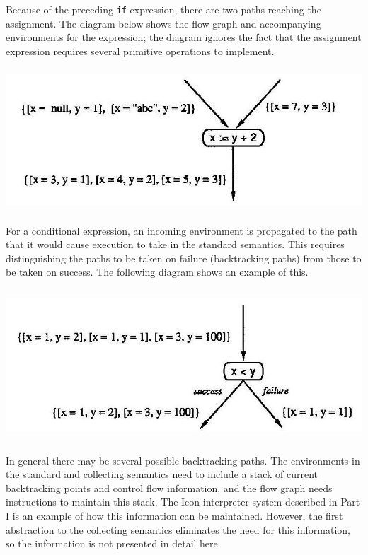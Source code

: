 Because of the preceding \texttt{if} expression, there are two paths
reaching the assignment. The diagram below shows the flow graph and
accompanying environments for the expression; the diagram ignores the
fact that the assignment expression requires several primitive
operations to implement.


 \includegraphics[width=6.0in,height=2.1in]{kw/figure3-5.png}  


For a conditional expression, an incoming environment is propagated to
the path that it would cause execution to take in the standard
semantics. This requires distinguishing the paths to be taken on
failure (backtracking paths) from those to be taken on success. The
following diagram shows an example of this.

{\centering  \includegraphics[width=5.3992in,height=2.2299in]{kw/figure3-6.png} \par}

In general there may be several possible backtracking paths. The
environments in the standard and collecting semantics need to include
a stack of current backtracking points and control flow information,
and the flow graph needs instructions to maintain this stack. The Icon
interpreter system described in Part I is an example of how this
information can be maintained. However, the first abstraction to the
collecting semantics eliminates the need for this information, so the
information is not presented in detail here.

